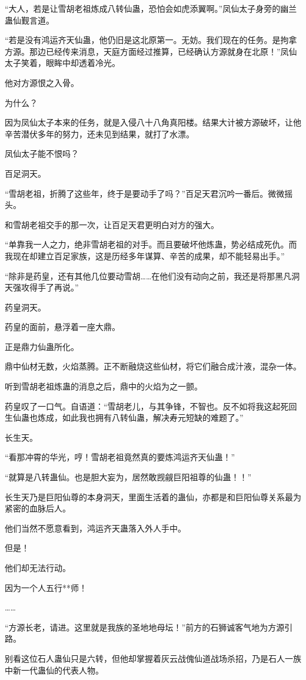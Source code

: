 \begin{this_body}
“大人，若是让雪胡老祖炼成八转仙蛊，恐怕会如虎添翼啊。”凤仙太子身旁的幽兰蛊仙觐言道。

“若是没有鸿运齐天仙蛊，他仍旧是这北原第一。无妨。我们现在的任务。是拘拿方源。那边已经传来消息，天庭方面经过推算，已经确认方源就身在北原！”凤仙太子笑着，眼眸中却透着冷光。

他对方源恨之入骨。

为什么？

因为凤仙太子本来的任务，就是入侵八十八角真阳楼。结果大计被方源破坏，让他辛苦潜伏多年的努力，还未见到结果，就打了水漂。

凤仙太子能不恨吗？

百足洞天。

“雪胡老祖，折腾了这些年，终于是要动手了吗？”百足天君沉吟一番后。微微摇头。

和雪胡老祖交手的那一次，让百足天君更明白对方的强大。

“单靠我一人之力，绝非雪胡老祖的对手。而且要破坏他炼蛊，势必结成死仇。而我现在却建立百足家族，这是历经多年谋算、辛苦的成果，却不能轻易出手。”

“除非是药皇，还有其他几位要动雪胡……在他们没有动向之前，我还是将那黑凡洞天强攻得手了再说。”

药皇洞天。

药皇的面前，悬浮着一座大鼎。

正是鼎力仙蛊所化。

鼎中仙材无数，火焰蒸腾。正不断融烧这些仙材，将它们融合成汁液，混杂一体。

听到雪胡老祖炼蛊的消息之后，鼎中的火焰为之一颤。

药皇叹了一口气。自语道：“雪胡老儿，与其争锋，不智也。反不如将我这起死回生仙蛊也炼成，如此我也拥有八转仙蛊，解决寿元短缺的难题了。”

长生天。

“看那冲霄的华光，哼！雪胡老祖竟然真的要炼鸿运齐天仙蛊！”

“就算是八转蛊仙。也是胆大妄为，居然敢觊觎巨阳祖尊的仙蛊！！”

长生天乃是巨阳仙尊的本身洞天，里面生活着的蛊仙，亦都是和巨阳仙尊关系最为紧密的血脉后人。

他们当然不愿意看到，鸿运齐天蛊落入外人手中。

但是！

他们却无法行动。

因为一个人五行**师！

……

“方源长老，请进。这里就是我族的圣地地母坛！”前方的石狮诚客气地为方源引路。

别看这位石人蛊仙只是六转，但他却掌握着灰云战傀仙道战场杀招，乃是石人一族中新一代蛊仙的代表人物。


\end{this_body}
